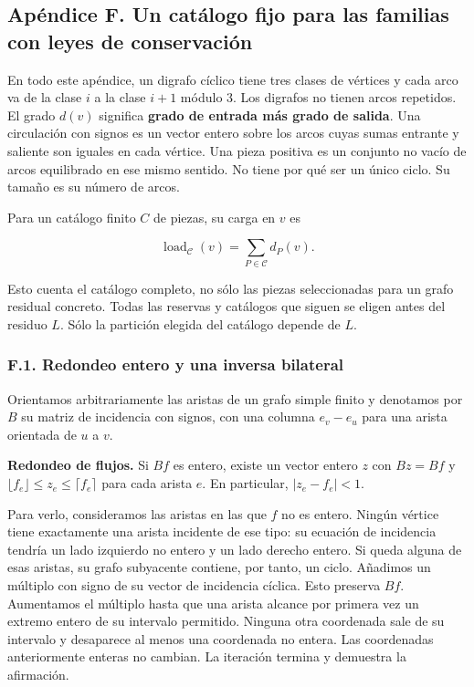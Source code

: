 \documentclass[spanish,11pt,a4paper]{article}
\begin{document}
\subsection{Apéndice F. Un catálogo fijo para las familias con leyes de conservación}\label{apuxe9ndice-f.-un-catuxe1logo-fijo-para-las-familias-con-leyes-de-conservaciuxf3n}

En todo este apéndice, un digrafo cíclico tiene tres clases de vértices y cada arco va de la clase \(i\) a la clase \(i+1\) módulo 3. Los digrafos no tienen arcos repetidos. El grado \(d(v)\) significa \textbf{grado de entrada más grado de salida}. Una circulación con signos es un vector entero sobre los arcos cuyas sumas entrante y saliente son iguales en cada vértice. Una pieza positiva es un conjunto no vacío de arcos equilibrado en ese mismo sentido. No tiene por qué ser un único ciclo. Su tamaño es su número de arcos.

Para un catálogo finito \(C\) de piezas, su carga en \(v\) es

\[\operatorname{load}_{\mathcal C}(v)=\sum_{P\in\mathcal C}d_P(v).\]

Esto cuenta el catálogo completo, no sólo las piezas seleccionadas para un grafo residual concreto. Todas las reservas y catálogos que siguen se eligen antes del residuo \(L\). Sólo la partición elegida del catálogo depende de \(L\).

\subsubsection{F.1. Redondeo entero y una inversa bilateral}\label{f.1.-redondeo-entero-y-una-inversa-bilateral}

Orientamos arbitrariamente las aristas de un grafo simple finito y denotamos por \(B\) su matriz de incidencia con signos, con una columna \(e_{v}-e_{u}\) para una arista orientada de \(u\) a \(v\).

\textbf{Redondeo de flujos.} Si \(Bf\) es entero, existe un vector entero \(z\) con \(Bz=Bf\) y \(\lfloor f_e\rfloor\le z_e\le\lceil f_e\rceil\) para cada arista \(e\). En particular, \(|z_{e}-f_{e}|<1\).

Para verlo, consideramos las aristas en las que \(f\) no es entero. Ningún vértice tiene exactamente una arista incidente de ese tipo: su ecuación de incidencia tendría un lado izquierdo no entero y un lado derecho entero. Si queda alguna de esas aristas, su grafo subyacente contiene, por tanto, un ciclo. Añadimos un múltiplo con signo de su vector de incidencia cíclica. Esto preserva \(Bf\). Aumentamos el múltiplo hasta que una arista alcance por primera vez un extremo entero de su intervalo permitido. Ninguna otra coordenada sale de su intervalo y desaparece al menos una coordenada no entera. Las coordenadas anteriormente enteras no cambian. La iteración termina y demuestra la afirmación.
\end{document}
